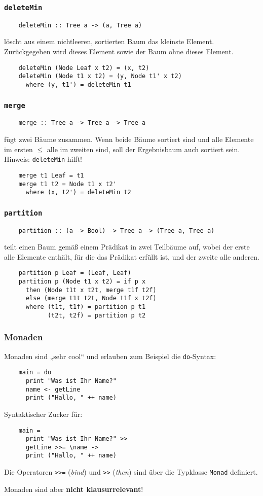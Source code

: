 \documentclass{beamer}
\begin{document}
\begin{frame}[fragile]
  \frametitle{\lstinline{deleteMin}}
  \begin{lstlisting}
    deleteMin :: Tree a -> (a, Tree a)
  \end{lstlisting}
  löscht aus einem nichtleeren, sortierten Baum das kleinste Element.
  Zurückgegeben wird dieses Element sowie der Baum ohne dieses Element.
  \pause
  \begin{lstlisting}
    deleteMin (Node Leaf x t2) = (x, t2)
    deleteMin (Node t1 x t2) = (y, Node t1' x t2)
      where (y, t1') = deleteMin t1
  \end{lstlisting}
\end{frame}

\begin{frame}[fragile]
  \frametitle{\lstinline{merge}}
  \begin{lstlisting}
    merge :: Tree a -> Tree a -> Tree a
  \end{lstlisting}
  fügt zwei Bäume zusammen.
  Wenn beide Bäume sortiert sind und alle Elemente im ersten $≤$ alle im zweiten sind,
  soll der Ergebnisbaum auch sortiert sein.
  Hinweis: \lstinline{deleteMin} hilft!
  \pause
  \begin{lstlisting}
    merge t1 Leaf = t1
    merge t1 t2 = Node t1 x t2'
      where (x, t2') = deleteMin t2
  \end{lstlisting}
\end{frame}

\begin{frame}[fragile]
  \frametitle{\lstinline{partition}}
  \begin{lstlisting}
    partition :: (a -> Bool) -> Tree a -> (Tree a, Tree a)
  \end{lstlisting}
  teilt einen Baum gemäß einem Prädikat in zwei Teilbäume auf,
  wobei der erste alle Elemente enthält, für die das Prädikat erfüllt ist,
  und der zweite alle anderen.
  \pause
  \begin{lstlisting}
    partition p Leaf = (Leaf, Leaf)
    partition p (Node t1 x t2) = if p x
      then (Node t1t x t2t, merge t1f t2f)
      else (merge t1t t2t, Node t1f x t2f)
      where (t1t, t1f) = partition p t1
            (t2t, t2f) = partition p t2
  \end{lstlisting}
\end{frame}

\begin{frame}[fragile]
  \frametitle{Monaden}
  Monaden sind „sehr cool“ und erlauben zum Beispiel die \lstinline{do}-Syntax:
  \begin{lstlisting}
    main = do
      print "Was ist Ihr Name?"
      name <- getLine
      print ("Hallo, " ++ name)
  \end{lstlisting}
  Syntaktischer Zucker für:
  \begin{lstlisting}
    main =
      print "Was ist Ihr Name?" >>
      getLine >>= \name ->
      print ("Hallo, " ++ name)
  \end{lstlisting}
  Die Operatoren \lstinline{>>=} (\emph{bind}) und \lstinline{>>} (\emph{then}) sind über die Typklasse \lstinline{Monad} definiert.
  
  Monaden sind aber \textbf{nicht klausurrelevant}!
\end{frame}
\end{document}
